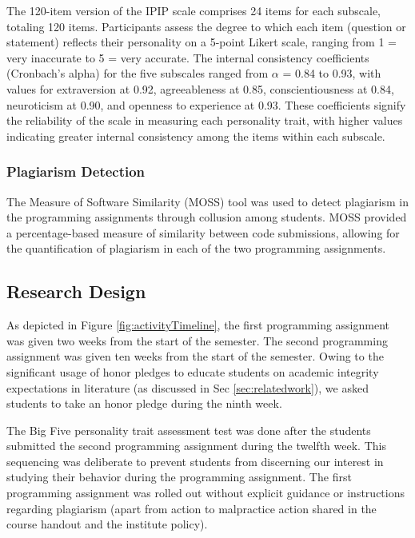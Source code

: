 The 120-item version of the IPIP scale comprises 24 items for each subscale, totaling 120 items. Participants assess the degree to which each item (question or statement) reflects their personality on a 5-point Likert scale, ranging from 1 = very inaccurate to 5 = very accurate. The internal consistency coefficients (Cronbach's alpha) for the five subscales ranged from \begin{math} \alpha \end{math} = 0.84 to 0.93, with values for extraversion at 0.92, agreeableness at 0.85, conscientiousness at 0.84, neuroticism at 0.90, and openness to experience at 0.93. These coefficients signify the reliability of the scale in measuring each personality trait, with higher values indicating greater internal consistency among the items within each subscale.

\subsubsection{Plagiarism Detection}

The Measure of Software Similarity (MOSS) tool \cite{MOSS} was used to detect plagiarism in the programming assignments through collusion among students. MOSS provided a percentage-based measure of similarity between code submissions, allowing for the quantification of plagiarism in each of the two programming assignments.

\subsection{Research Design}

As depicted in Figure \ref{fig:activityTimeline}, the first programming assignment was given two weeks from the start of the semester. The second programming assignment was given ten weeks from the start of the semester. Owing to the significant usage of honor pledges to educate students on academic integrity expectations in literature (as discussed in Sec \ref{sec:relatedwork}), we asked students to take an honor pledge during the ninth week.

The Big Five personality trait assessment test was done after the students submitted the second programming assignment during the twelfth week. This sequencing was deliberate to prevent students from discerning our interest in studying their behavior during the programming assignment. The first programming assignment was rolled out without explicit guidance or instructions regarding plagiarism (apart from action to malpractice action shared in the course handout and the institute policy).

